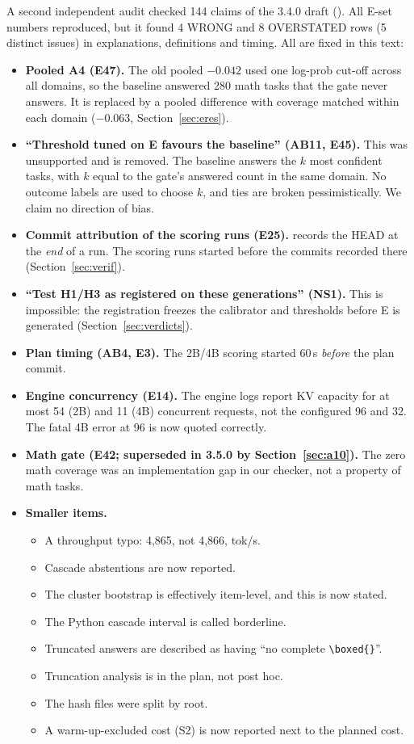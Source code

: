 \documentclass[11pt,a4paper]{article}
\newcommand{\code}[1]{\texttt{\detokenize{#1}}}
\begin{document}
A second independent audit checked 144 claims of the 3.4.0 draft (\code{docs/CLAIM_AUDIT_340.md}).
All E-set numbers reproduced, but it found 4 WRONG and 8 OVERSTATED rows (5 distinct issues) in
explanations, definitions and timing. All are fixed in this text:
\begin{itemize}
\item \textbf{Pooled A4 (E47).} The old pooled $-0.042$ used one log-prob cut-off across all domains,
  so the baseline answered 280 math tasks that the gate never answers. It is replaced by a pooled
  difference with coverage matched within each domain ($-0.063$, Section~\ref{sec:eres}).
\item \textbf{``Threshold tuned on E favours the baseline'' (AB11, E45).} This was unsupported and is
  removed. The baseline answers the $k$ most confident tasks, with $k$ equal to the gate's answered
  count in the same domain. No outcome labels are used to choose $k$, and ties are broken
  pessimistically. We claim no direction of bias.
\item \textbf{Commit attribution of the scoring runs (E25).} \code{results.json} records the HEAD at
  the \emph{end} of a run. The scoring runs started before the commits recorded there
  (Section~\ref{sec:verif}).
\item \textbf{``Test H1/H3 as registered on these generations'' (NS1).} This is impossible: the
  registration freezes the calibrator and thresholds before E is generated (Section~\ref{sec:verdicts}).
\item \textbf{Plan timing (AB4, E3).} The 2B/4B scoring started 60\,s \emph{before} the plan commit.
\item \textbf{Engine concurrency (E14).} The engine logs report KV capacity for at most 54 (2B) and 11
  (4B) concurrent requests, not the configured 96 and 32. The fatal 4B error at 96 is now quoted
  correctly.
\item \textbf{Math gate (E42; superseded in 3.5.0 by Section~\ref{sec:a10}).} The zero math coverage was an implementation gap in our checker, not a
  property of math tasks.
\item \textbf{Smaller items.}
  \begin{itemize}
  \item A throughput typo: 4,865, not 4,866, tok/s.
  \item Cascade abstentions are now reported.
  \item The cluster bootstrap is effectively item-level, and this is now stated.
  \item The Python cascade interval is called borderline.
  \item Truncated answers are described as having ``no complete \verb|\boxed{}|''.
  \item Truncation analysis is in the plan, not post hoc.
  \item The hash files were split by root.
  \item A warm-up-excluded cost (S2) is now reported next to the planned cost.
  \end{itemize}
\end{itemize}
\end{document}
